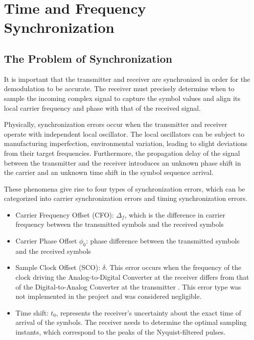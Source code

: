 \section{Time and Frequency Synchronization}
\subsection{The Problem of Synchronization}
It is important that the transmitter and receiver are synchronized in order for the demodulation to be accurate. The receiver must precisely determine when to sample the incoming complex signal to capture the symbol values and align its local carrier frequency and phase with that of the received signal. \par
Physically, synchronization errors occur when the transmitter and receiver operate with independent local oscillator. The local oscillators can be subject to manufacturing imperfection, environmental variation, leading to slight deviations from their target frequencies. Furthermore, the propagation delay of the signal between the transmitter and the receiver introduces an unknown phase shift in the carrier and an unknown time shift in the symbol sequence arrival.\par
These phenomena give rise to four types of synchronization errors, which can be categorized into carrier synchronization errors and timing synchronization errors.
\begin{itemize}
	\item Carrier Frequency Offset (CFO): $\Delta_f$, which is the difference in carrier frequency between the transmitted symbols and the received symbols
	\item Carrier Phase Offset $\phi_0$: phase difference between the transmitted symbols and the received symbols
	\item Sample Clock Offset (SCO): $\delta$. This error occurs when the frequency of the clock driving the Analog-to-Digital Converter at the receiver differs from that of the Digital-to-Analog Converter at the transmitter	. This error type was not implemented in the project and was considered negligible.
	\item Time shift: $t_0$, represents the receiver's uncertainty about the exact time of arrival of the symbols. The receiver needs to determine the optimal sampling instants, which correspond to the peaks of the Nyquist-filtered pulses.
\end{itemize}

